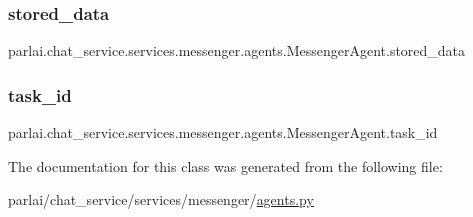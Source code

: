 \subsubsection{\texorpdfstring{stored\+\_\+data}{stored\_data}}
{\footnotesize\ttfamily parlai.\+chat\+\_\+service.\+services.\+messenger.\+agents.\+Messenger\+Agent.\+stored\+\_\+data}

\mbox{\label{classparlai_1_1chat__service_1_1services_1_1messenger_1_1agents_1_1MessengerAgent_a1be389d7ba217ad749d324d31fc1c4ba}} 
\subsubsection{\texorpdfstring{task\+\_\+id}{task\_id}}
{\footnotesize\ttfamily parlai.\+chat\+\_\+service.\+services.\+messenger.\+agents.\+Messenger\+Agent.\+task\+\_\+id}



The documentation for this class was generated from the following file\+:\begin{DoxyCompactItemize}
\item 
parlai/chat\+\_\+service/services/messenger/\hyperlink{parlai_2chat__service_2services_2messenger_2agents_8py}{agents.\+py}\end{DoxyCompactItemize}
